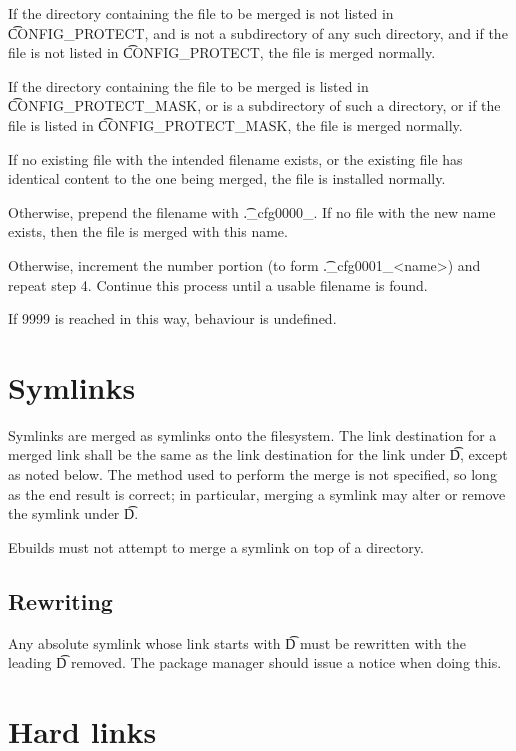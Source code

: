 \begin{compactenum}
\item If the directory containing the file to be merged is not listed in \t{CONFIG_PROTECT}, and is
    not a subdirectory of any such directory, and if the file is not listed in \t{CONFIG_PROTECT},
    the file is merged normally.
\item If the directory containing the file to be merged is listed in \t{CONFIG_PROTECT_MASK}, or
    is a subdirectory of such a directory, or if the file is listed in \t{CONFIG_PROTECT_MASK},
    the file is merged normally.
\item If no existing file with the intended filename exists, or the existing file has identical
    content to the one being merged, the file is installed normally.
\item Otherwise, prepend the filename with \t{._cfg0000_}. If no file with the new name exists,
    then the file is merged with this name.
\item Otherwise, increment the number portion (to form \t{._cfg0001_<name>}) and repeat step 4.
    Continue this process until a usable filename is found.
\item If 9999 is reached in this way, behaviour is undefined.
\end{compactenum}

\section{Symlinks}

Symlinks are merged as symlinks onto the filesystem. The link destination for a merged link shall be
the same as the link destination for the link under \t{D}, except as noted below. The method used to
perform the merge is not specified, so long as the end result is correct; in particular, merging a
symlink may alter or remove the symlink under \t{D}.

Ebuilds must not attempt to merge a symlink on top of a directory.

\subsection{Rewriting}

Any absolute symlink whose link starts with \t{D} must be rewritten with the leading \t{D} removed.
The package manager should issue a notice when doing this.

\section{Hard links}

